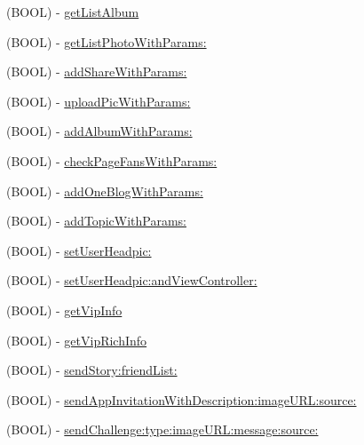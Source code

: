 \begin{DoxyCompactItemize}
\item 
(B\+O\+OL) -\/ \mbox{\hyperlink{interface_tencent_o_auth_a92728cf8bb95d933d06eca5b0109b200}{get\+List\+Album}}
\item 
(B\+O\+OL) -\/ \mbox{\hyperlink{interface_tencent_o_auth_ae60ab4bbb851f267106ee4889e5d9f81}{get\+List\+Photo\+With\+Params\+:}}
\item 
(B\+O\+OL) -\/ \mbox{\hyperlink{interface_tencent_o_auth_ab7f1ab3ecde38d8324456b306ebb3f7b}{add\+Share\+With\+Params\+:}}
\item 
(B\+O\+OL) -\/ \mbox{\hyperlink{interface_tencent_o_auth_a3345d746ba1bcdf4621a0fcc0a9f4237}{upload\+Pic\+With\+Params\+:}}
\item 
(B\+O\+OL) -\/ \mbox{\hyperlink{interface_tencent_o_auth_ade1376b852ac4968ad344b251edd129d}{add\+Album\+With\+Params\+:}}
\item 
(B\+O\+OL) -\/ \mbox{\hyperlink{interface_tencent_o_auth_aecd70d7b1b09dfce385f4b79f69450c3}{check\+Page\+Fans\+With\+Params\+:}}
\item 
(B\+O\+OL) -\/ \mbox{\hyperlink{interface_tencent_o_auth_a18bddf0cc13d3d6518bebbe9150457e0}{add\+One\+Blog\+With\+Params\+:}}
\item 
(B\+O\+OL) -\/ \mbox{\hyperlink{interface_tencent_o_auth_a501c96fc5ebf901a0faa3a83998f372d}{add\+Topic\+With\+Params\+:}}
\item 
(B\+O\+OL) -\/ \mbox{\hyperlink{interface_tencent_o_auth_a2efce592b134d225f092451cdfe7fd99}{set\+User\+Headpic\+:}}
\item 
(B\+O\+OL) -\/ \mbox{\hyperlink{interface_tencent_o_auth_afd9016fc8dbd669e309fb90f938436a3}{set\+User\+Headpic\+:and\+View\+Controller\+:}}
\item 
(B\+O\+OL) -\/ \mbox{\hyperlink{interface_tencent_o_auth_a0dca2b46ec141f5718f2fc8cecab251a}{get\+Vip\+Info}}
\item 
(B\+O\+OL) -\/ \mbox{\hyperlink{interface_tencent_o_auth_a6adee28cfff5d7f7cca6a648e1f2f638}{get\+Vip\+Rich\+Info}}
\item 
(B\+O\+OL) -\/ \mbox{\hyperlink{interface_tencent_o_auth_aa76ffb6e9da35a33210db470dc84f16d}{send\+Story\+:friend\+List\+:}}
\item 
(B\+O\+OL) -\/ \mbox{\hyperlink{interface_tencent_o_auth_aadda5cfd847a7fc39a573590f65d9184}{send\+App\+Invitation\+With\+Description\+:image\+U\+R\+L\+:source\+:}}
\item 
(B\+O\+OL) -\/ \mbox{\hyperlink{interface_tencent_o_auth_a9e34d42918cecd3b8b25343953d5ac6a}{send\+Challenge\+:type\+:image\+U\+R\+L\+:message\+:source\+:}}

\end{DoxyCompactItemize}
